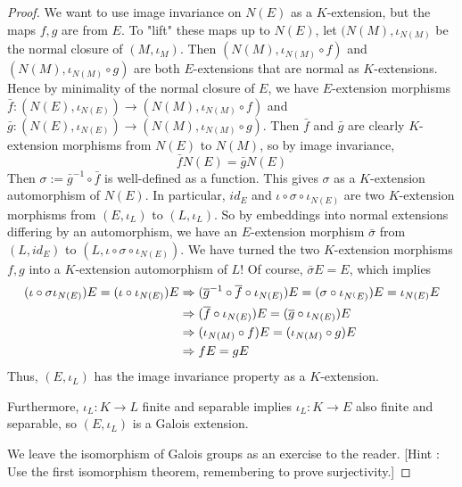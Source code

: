 \documentclass[../book.tex]{subfiles}
\begin{document}
\begin{proof}
        We want to use image invariance on $N(E)$ as a $K$-extension,
        but the maps $f, g$ are from $E$. 
        To "lift" these maps up to $N(E)$, 
        let $(N(M),\iota_{N(M)}$ be the normal closure of $(M,\iota_M)$. 
        Then $(N(M),\iota_{N(M)}\circ f)$ and $(N(M),\iota_{N(M)}\circ g)$
        are both $E$-extensions that are normal as $K$-extensions.
        Hence by minimality of the normal closure of $E$, 
        we have $E$-extension morphisms 
        $\bar{f} : (N(E),\iota_{N(E)}) \to (N(M),\iota_{N(M)}\circ f)$
        and $\bar{g} : (N(E),\iota_{N(E)}) \to (N(M),\iota_{N(M)}\circ g)$.
        Then $\bar{f}$ and $\bar{g}$ are clearly $K$-extension morphisms
        from $N(E)$ to $N(M)$,
        so by image invariance, \[ \bar{f} N(E) = \bar{g} N(E) \]
        Then $\sigma := \bar{g}^{-1} \circ \bar{f}$ is well-defined as a function.
        This gives $\sigma$ as a $K$-extension automorphism of $N(E)$. 
        In particular, $id_E$ and $\iota\circ\sigma\circ\iota_{N(E)}$ 
        are two $K$-extension morphisms from $(E,\iota_L)$ to $(L,\iota_L)$.
        So by embeddings into normal extensions differing by an automorphism, 
        we have an $E$-extension morphism $\bar{\sigma}$
        from $(L,id_E)$ to $(L,\iota\circ\sigma\circ\iota_{N(E)})$.
        We have turned the two $K$-extension morphisms $f, g$ into 
        a $K$-extension automorphism of $L$!
        Of course, $\bar{\sigma} E = E$, which implies \begin{align*}
            (\iota\circ\sigma\iota_{N(E)}) E = (\iota\circ\iota_{N(E)}) E &\Rightarrow
            (\overline{g}^{-1}\circ\overline{f}\circ\iota_{N(E)}) E = (\sigma\circ\iota_{N^(E)})E
                = \iota_{N(E)} E \\
            &\Rightarrow (\overline{f}\circ\iota_{N(E)}) E = (\overline{g}\circ\iota_{N(E)}) E \\
            &\Rightarrow (\iota_{N(M)}\circ f) E = (\iota_{N(M)}\circ g) E \\
            &\Rightarrow f E = g E
        \end{align*}
        Thus, $(E,\iota_L)$ has the image invariance property as a $K$-extension. 
        
        Furthermore, $\iota_L : K \to L$ finite and separable implies 
        $\iota_L : K \to E$ also finite and separable,
        so $(E,\iota_L)$ is a Galois extension. 
        
        We leave the isomorphism of Galois groups as an exercise to the reader. 
        [Hint : Use the first isomorphism theorem, remembering to prove surjectivity.]
\end{proof}
\end{document}
